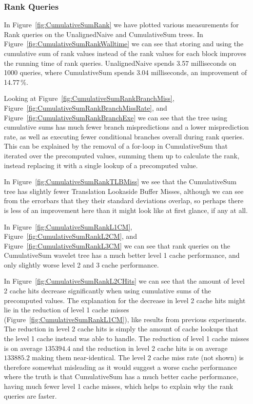 \restoregeometry

\subsubsection{Rank Queries}
In Figure~\ref{fig:CumulativeSumRank} we have plotted various measurements for Rank queries on the UnalignedNaive and CumulativeSum trees.
In Figure~\ref{fig:CumulativeSumRankWalltime} we can see that storing and using the cumulative sum of rank values instead of the rank values for each block improves the running time of rank queries.
UnalignedNaive spends 3.57 milliseconds on 1000 queries, where CumulativeSum spends 3.04 milliseconds, an improvement of 14.77\,\%.

Looking at Figure~\ref{fig:CumulativeSumRankBranchMiss}, Figure~\ref{fig:CumulativeSumRankBranchMissRate}, and Figure~\ref{fig:CumulativeSumRankBranchExe} we can see that the tree using cumulative sums has much fewer branch mispredictions and a lower misprediction rate, as well as executing fewer conditional branches overall during rank queries.
This can be explained by the removal of a for-loop in CumulativeSum that iterated over the precomputed values, summing them up to calculate the rank, instead replacing it with a single lookup of a precomputed value.

In Figure~\ref{fig:CumulativeSumRankTLBMiss} we see that the CumulativeSum tree has slightly fewer Translation Lookaside Buffer Misses, although we can see from the errorbars that they their standard deviations overlap, so perhaps there is less of an improvement here than it might look like at first glance, if any at all.

In Figure~\ref{fig:CumulativeSumRankL1CM}, Figure~\ref{fig:CumulativeSumRankL2CM}, and Figure~\ref{fig:CumulativeSumRankL3CM} we can see that rank queries on the CumulativeSum wavelet tree has a much better level 1 cache performance, and only slightly worse level 2 and 3 cache performance.

In Figure~\ref{fig:CumulativeSumRankL2CHits} we can see that the amount of level 2 cache hits decrease significantly when using cumulative sums of the precomputed values.
The explanation for the decrease in level 2 cache hits might lie in the reduction of level 1 cache misses (Figure~\ref{fig:CumulativeSumRankL1CM}), like results from previous experiments.
The reduction in level 2 cache hits is simply the amount of cache lookups that the level 1 cache instead was able to handle.
The reduction of level 1 cache misses is on average $\num{135394.4}$ and the reduction in level 2 cache hits is on average $\num{133885.2}$ making them near-identical.
The level 2 cache miss rate (not shown) is therefore somewhat misleading as it would suggest a worse cache performance where the truth is that CumulativeSum has a much better cache performance, having much fewer level 1 cache misses, which helps to explain why the rank queries are faster.



